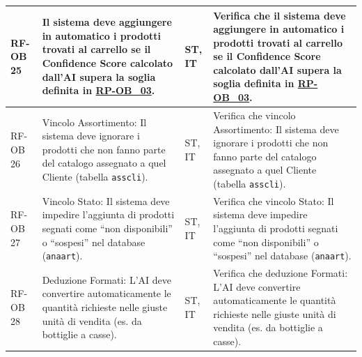 \documentclass[a4paper,11pt,oneside]{scrartcl}
\begin{document}
\begin{longtable}{|p{1.5cm}|p{4.5cm}|p{1.8cm}|p{6cm}|}
    RF-OB 25         & Il sistema deve aggiungere in automatico i prodotti trovati al carrello se il Confidence Score calcolato dall'AI supera la soglia definita in \hyperlink{rp-ob_3}{RP-OB\_03}.                                                                                                                         & ST, IT             & Verifica che il sistema deve aggiungere in automatico i prodotti trovati al carrello se il Confidence Score calcolato dall'AI supera la soglia definita in \hyperlink{rp-ob_3}{RP-OB\_03}.                                                                                                                         \\ \hline
    RF-OB 26         & Vincolo Assortimento: Il sistema deve ignorare i prodotti che non fanno parte del catalogo assegnato a quel Cliente (tabella \texttt{asscli}).                                                                                                                                                        & ST, IT             & Verifica che vincolo Assortimento: Il sistema deve ignorare i prodotti che non fanno parte del catalogo assegnato a quel Cliente (tabella \texttt{asscli}).                                                                                                                                                        \\ \hline
    RF-OB 27         & Vincolo Stato: Il sistema deve impedire l'aggiunta di prodotti segnati come ``non disponibili'' o ``sospesi'' nel database (\texttt{anaart}).                                                                                                                                                         & ST, IT             & Verifica che vincolo Stato: Il sistema deve impedire l'aggiunta di prodotti segnati come ``non disponibili'' o ``sospesi'' nel database (\texttt{anaart}).                                                                                                                                                         \\ \hline
    RF-OB 28         & Deduzione Formati: L'AI deve convertire automaticamente le quantità richieste nelle giuste unità di vendita (es. da bottiglie a casse).                                                                                                                                                               & ST, IT             & Verifica che deduzione Formati: L'AI deve convertire automaticamente le quantità richieste nelle giuste unità di vendita (es. da bottiglie a casse).                                                                                                                                                               \\ \hline

\end{longtable}
\end{document}
